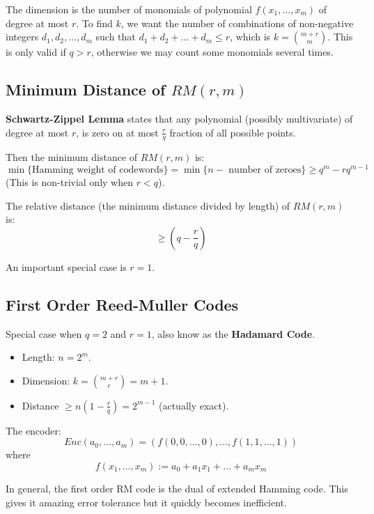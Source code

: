 \documentclass[11pt]{article}
\begin{document}
The dimension is the number of monomials of polynomial $f(x_1, \ldots, x_m)$ of degree at most $r$.
To find $k$, we want the number of combinations of non-negative integers $d_1, d_2, \ldots, d_m$ such that $d_1 + d_2 + \ldots + d_m \leq r$, which is $k = \binom{m + r}{m}$.
This is only valid if $q > r$, otherwise we may count some monomials several times.

\subsection{Minimum Distance of $RM(r, m)$}
\textbf{Schwartz-Zippel Lemma} states that any polynomial (possibly multivariate) of degree at most $r$, is zero on at most $\frac{r}{q}$ fraction of all possible points.

Then the minimum distance of $RM(r, m)$ is:
\[
  \min \{ \text{Hamming weight of codewords}\} = \min \{ n - \text{ number of zeroes}\} \geq q^m - rq^{m-1}
\]
(This is non-trivial only when $r < q$).

The relative distance (the minimum distance divided by length) of $RM(r, m)$ is:
\[
  \geq (q - \frac{r}{q})
\]

An important special case is $r = 1$.

\subsection{First Order Reed-Muller Codes}
Special case when $q = 2$ and $r = 1$, also know as the \textbf{Hadamard Code}.
\begin{itemize}
  \item Length: $n = 2^m$.
  \item Dimension: $k = \binom{m + r}{r} = m + 1$.
  \item Distance $\geq n(1 - \frac{r}{q}) = 2^{m - 1}$ (actually exact).
\end{itemize}

The encoder:
\[
  Enc(a_0, \ldots, a_m) = (f(0, 0, \ldots, 0), \ldots, f(1, 1, \ldots, 1))
\]
where
\[
  f(x_1, \ldots, x_m) := a_0 + a_1x_1 + \ldots + a_mx_m
\]

In general, the first order RM code is the dual of extended Hamming code.
This gives it amazing error tolerance but it quickly becomes inefficient.
\end{document}

